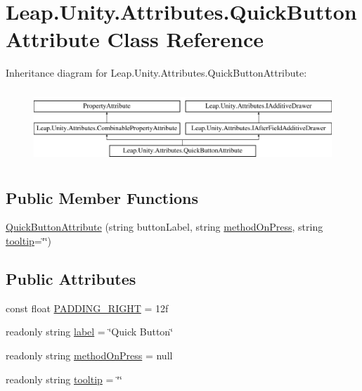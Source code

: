 \hypertarget{class_leap_1_1_unity_1_1_attributes_1_1_quick_button_attribute}{}\section{Leap.\+Unity.\+Attributes.\+Quick\+Button\+Attribute Class Reference}
\label{class_leap_1_1_unity_1_1_attributes_1_1_quick_button_attribute}
Inheritance diagram for Leap.\+Unity.\+Attributes.\+Quick\+Button\+Attribute\+:\begin{figure}[H]
\begin{center}
\leavevmode
\includegraphics[height=2.772277cm]{class_leap_1_1_unity_1_1_attributes_1_1_quick_button_attribute}
\end{center}
\end{figure}
\subsection*{Public Member Functions}
\begin{DoxyCompactItemize}
\item 
\mbox{\hyperlink{class_leap_1_1_unity_1_1_attributes_1_1_quick_button_attribute_aeafd86617f66ecd79c8958051afbd683}{Quick\+Button\+Attribute}} (string button\+Label, string \mbox{\hyperlink{class_leap_1_1_unity_1_1_attributes_1_1_quick_button_attribute_a8295c05cc5c0a212b6c2b28696173e13}{method\+On\+Press}}, string \mbox{\hyperlink{class_leap_1_1_unity_1_1_attributes_1_1_quick_button_attribute_a9ea791294608d9ae4d1f4323bc32a562}{tooltip}}=\char`\"{}\char`\"{})
\end{DoxyCompactItemize}
\subsection*{Public Attributes}
\begin{DoxyCompactItemize}
\item 
const float \mbox{\hyperlink{class_leap_1_1_unity_1_1_attributes_1_1_quick_button_attribute_add01e6a830eb9fcaffa00743a0df433f}{P\+A\+D\+D\+I\+N\+G\+\_\+\+R\+I\+G\+HT}} = 12f
\item 
readonly string \mbox{\hyperlink{class_leap_1_1_unity_1_1_attributes_1_1_quick_button_attribute_a0225c8e297a3da1008ea6fd9913c2c7b}{label}} = \char`\"{}Quick Button\char`\"{}
\item 
readonly string \mbox{\hyperlink{class_leap_1_1_unity_1_1_attributes_1_1_quick_button_attribute_a8295c05cc5c0a212b6c2b28696173e13}{method\+On\+Press}} = null
\item 
readonly string \mbox{\hyperlink{class_leap_1_1_unity_1_1_attributes_1_1_quick_button_attribute_a9ea791294608d9ae4d1f4323bc32a562}{tooltip}} = \char`\"{}\char`\"{}
\end{DoxyCompactItemize}
